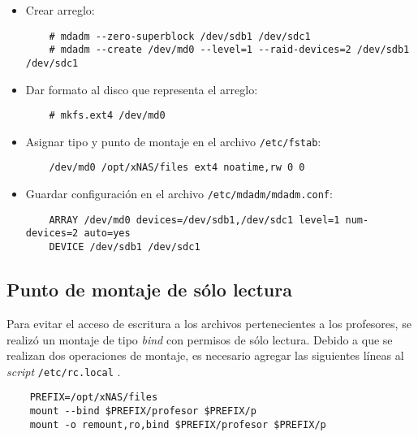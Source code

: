 \begin{itemize}
\begin{itemize}
    \end{itemize}
  \item Crear arreglo:

{
\scriptsize
\linespread{1}
\begin{verbatim}
    # mdadm --zero-superblock /dev/sdb1 /dev/sdc1
    # mdadm --create /dev/md0 --level=1 --raid-devices=2 /dev/sdb1 /dev/sdc1
\end{verbatim}
}

  \item Dar formato al disco que representa el arreglo:

{
\scriptsize
\linespread{1}
\begin{verbatim}
    # mkfs.ext4 /dev/md0
\end{verbatim}
}

  \item Asignar tipo y punto de montaje en el archivo \texttt{/etc/fstab}:

{
\scriptsize
\linespread{1}
\begin{verbatim}
    /dev/md0 /opt/xNAS/files ext4 noatime,rw 0 0
\end{verbatim}
}

  \item Guardar configuraci\'{o}n en el archivo \texttt{/etc/mdadm/mdadm.conf}:

{
\scriptsize
\linespread{1}
\begin{verbatim}
    ARRAY /dev/md0 devices=/dev/sdb1,/dev/sdc1 level=1 num-devices=2 auto=yes
    DEVICE /dev/sdb1 /dev/sdc1
\end{verbatim}
}

\end{itemize}

      \subsection {Punto de montaje de s\'{o}lo lectura}

Para evitar el acceso de escritura a los archivos pertenecientes a los profesores, se realiz\'{o} un montaje de tipo \textit{bind} con permisos de s\'{o}lo lectura. Debido a que se realizan dos operaciones de montaje, es necesario agregar las siguientes l\'{i}neas al \textit{script} \texttt{/etc/rc.local} \cite{_mount_????} \cite{_read-only_????} \cite{_karel_????}.

{
\scriptsize
\linespread{1}
\begin{verbatim}
	PREFIX=/opt/xNAS/files
	mount --bind $PREFIX/profesor $PREFIX/p
	mount -o remount,ro,bind $PREFIX/profesor $PREFIX/p
\end{verbatim}
}

